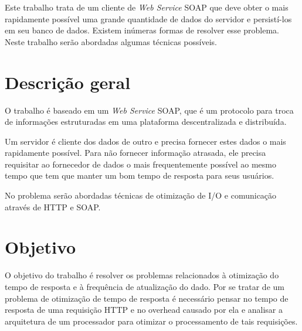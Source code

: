 
\label{Cap:introducao}

Este trabalho trata de um cliente de \textit{Web Service} SOAP que deve obter o mais rapidamente possível uma grande quantidade de dados do servidor e persistí-los em seu banco de dados. Existem inúmeras formas de resolver esse problema. Neste trabalho serão abordadas algumas técnicas possíveis.

\section{Descrição geral}

O trabalho é baseado em um \textit{Web Service} SOAP, que é um protocolo para troca de informações estruturadas em uma plataforma descentralizada e distribuída.

Um servidor é cliente dos dados de outro e precisa fornecer estes dados o mais rapidamente possível. Para não fornecer informação atrasada, ele precisa requisitar ao fornecedor de dados o mais frequentemente possível ao mesmo tempo que tem que manter um bom tempo de resposta para seus usuários.

No problema serão abordadas técnicas de otimização de I/O e comunicação através de HTTP e SOAP.

\section{Objetivo}

O objetivo do trabalho é resolver os problemas relacionados à otimização do tempo de resposta e à frequência de atualização do dado. Por se tratar de um problema de otimização de tempo de resposta é necessário pensar no tempo de resposta de uma requisição HTTP e no overhead causado por ela e analisar a arquitetura de um processador para otimizar o processamento de tais requisições.

